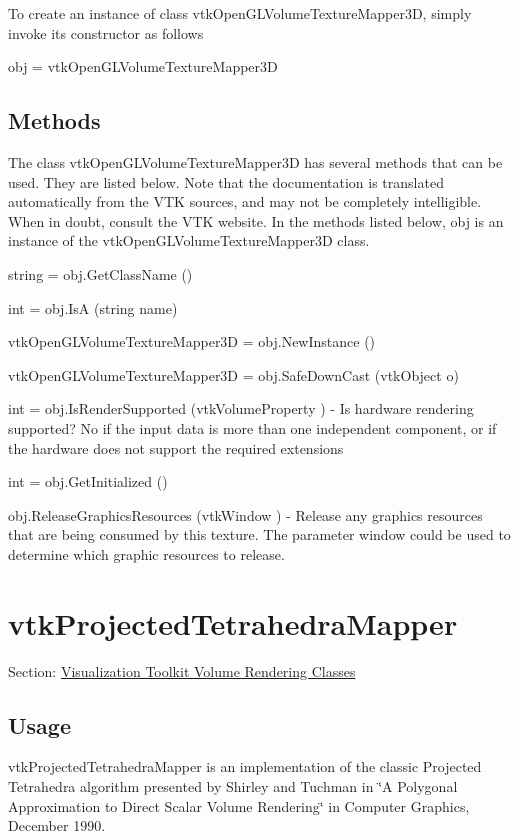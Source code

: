 To create an instance of class vtk\-Open\-G\-L\-Volume\-Texture\-Mapper3\-D, simply invoke its constructor as follows \begin{DoxyVerb}  obj = vtkOpenGLVolumeTextureMapper3D
\end{DoxyVerb}
 \hypertarget{vtkwidgets_vtkxyplotwidget_Methods}{}\subsection{Methods}\label{vtkwidgets_vtkxyplotwidget_Methods}
The class vtk\-Open\-G\-L\-Volume\-Texture\-Mapper3\-D has several methods that can be used. They are listed below. Note that the documentation is translated automatically from the V\-T\-K sources, and may not be completely intelligible. When in doubt, consult the V\-T\-K website. In the methods listed below, {\ttfamily obj} is an instance of the vtk\-Open\-G\-L\-Volume\-Texture\-Mapper3\-D class. 
\begin{DoxyItemize}
\item {\ttfamily string = obj.\-Get\-Class\-Name ()}  
\item {\ttfamily int = obj.\-Is\-A (string name)}  
\item {\ttfamily vtk\-Open\-G\-L\-Volume\-Texture\-Mapper3\-D = obj.\-New\-Instance ()}  
\item {\ttfamily vtk\-Open\-G\-L\-Volume\-Texture\-Mapper3\-D = obj.\-Safe\-Down\-Cast (vtk\-Object o)}  
\item {\ttfamily int = obj.\-Is\-Render\-Supported (vtk\-Volume\-Property )} -\/ Is hardware rendering supported? No if the input data is more than one independent component, or if the hardware does not support the required extensions  
\item {\ttfamily int = obj.\-Get\-Initialized ()}  
\item {\ttfamily obj.\-Release\-Graphics\-Resources (vtk\-Window )} -\/ Release any graphics resources that are being consumed by this texture. The parameter window could be used to determine which graphic resources to release.  
\end{DoxyItemize}\hypertarget{vtkvolumerendering_vtkprojectedtetrahedramapper}{}\section{vtk\-Projected\-Tetrahedra\-Mapper}\label{vtkvolumerendering_vtkprojectedtetrahedramapper}
Section\-: \hyperlink{sec_vtkvolumerendering}{Visualization Toolkit Volume Rendering Classes} \hypertarget{vtkwidgets_vtkxyplotwidget_Usage}{}\subsection{Usage}\label{vtkwidgets_vtkxyplotwidget_Usage}
vtk\-Projected\-Tetrahedra\-Mapper is an implementation of the classic Projected Tetrahedra algorithm presented by Shirley and Tuchman in \char`\"{}\-A
 Polygonal Approximation to Direct Scalar Volume Rendering\char`\"{} in Computer Graphics, December 1990.

